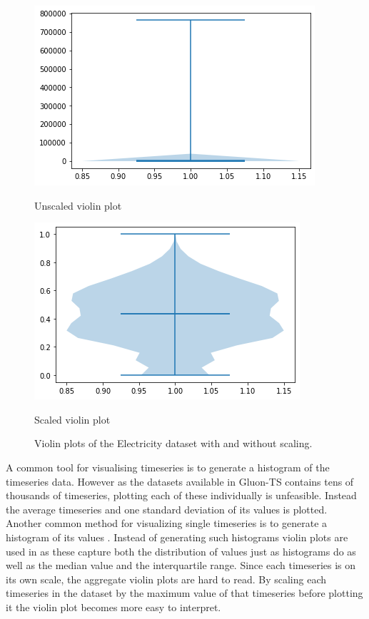 \begin{figure}[htb]
    \centering
    \includegraphics[width=\linewidth]{./img/electricity_violin_unscaled.png}
    \caption{Unscaled violin plot}

    \label{fig:electricity_violin_unscaled}
    \endminipage\hfill
    \includegraphics[width=\linewidth]{./img/electricity_violin.png}
    \caption{Scaled violin plot}
    \label{fig:electricity_violin_scaled}
    \endminipage\hfill
    \caption{Violin plots of the Electricity dataset with and without scaling.}
\end{figure}

A common tool for visualising timeseries is to generate a histogram of the timeseries data. However as the datasets available in Gluon-TS contains tens of thousands of timeseries, plotting each of these individually is unfeasible. Instead the average timeseries and one standard deviation of its values is plotted. Another common method for visualizing single timeseries is to generate a histogram of its values \cite{hyndman_forecasting_3rd}. Instead of generating such histograms violin plots are used in as these capture both the distribution of values just as histograms do as well as the median value and the interquartile range. Since each timeseries is on its own scale, the aggregate violin plots are hard to read. By scaling each timeseries in the dataset by the maximum value of that timeseries before plotting it the violin plot becomes more easy to interpret.

